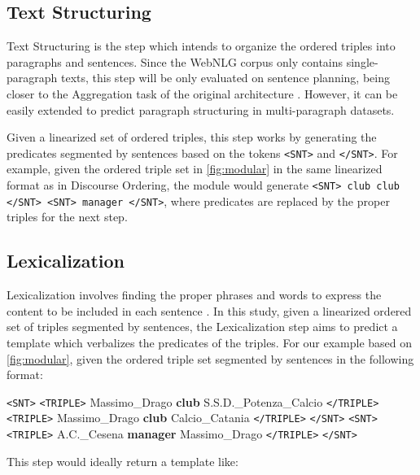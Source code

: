 \documentclass[11pt,a4paper]{article}
\begin{document}
\subsection{Text Structuring}
Text Structuring is the step which intends to organize the ordered triples into paragraphs and sentences. Since the WebNLG corpus only contains single-paragraph texts, this step will be only evaluated on sentence planning, being closer to the Aggregation task of the original architecture \cite{reiter2000}. However, it can be easily extended to predict paragraph structuring in multi-paragraph datasets.

Given a linearized set of ordered triples, this step works by generating the predicates segmented by sentences based on the tokens \texttt{<SNT>} and \texttt{</SNT>}. For example, given the ordered triple set in \autoref{fig:modular} in the same linearized format as in Discourse Ordering, the module would generate \texttt{<SNT> club club </SNT> <SNT> manager </SNT>}, where predicates are replaced by the proper triples for the next step.

\subsection{Lexicalization}
Lexicalization involves finding the proper phrases and words to express the content to be included in each sentence \cite{reiter2000}. In this study, given a linearized ordered set of triples segmented by sentences, the Lexicalization step aims to predict a template which verbalizes the predicates of the triples. For our example based on \autoref{fig:modular}, given the ordered triple set segmented by sentences in the following format:

\vspace{0.3cm}
\begin{displayquote}
    \footnotesize
    \vspace{0.1cm}
    \noindent \texttt{<SNT>} \texttt{<TRIPLE>} Massimo\_Drago \textbf{club} S.S.D.\_Potenza\_Calcio \texttt{</TRIPLE>} \texttt{<TRIPLE>} Massimo\_Drago \textbf{club} Calcio\_Catania \texttt{</TRIPLE>} \texttt{</SNT>} \texttt{<SNT>} \texttt{<TRIPLE>} A.C.\_Cesena \textbf{manager} Massimo\_Drago \texttt{</TRIPLE>} \texttt{</SNT>}
    
    
    \vspace{0.1cm}
\end{displayquote}
\vspace{0.2cm}

This step would ideally return a template like:
\end{document}
